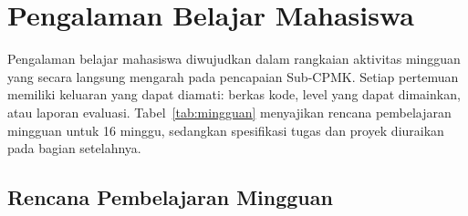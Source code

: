 
\section{Pengalaman Belajar Mahasiswa}

Pengalaman belajar mahasiswa diwujudkan dalam rangkaian aktivitas mingguan yang
secara langsung mengarah pada pencapaian Sub-CPMK. Setiap pertemuan memiliki
keluaran yang dapat diamati: berkas kode, level yang dapat dimainkan, atau
laporan evaluasi. Tabel~\ref{tab:mingguan} menyajikan rencana pembelajaran
mingguan untuk 16 minggu, sedangkan spesifikasi tugas dan proyek diuraikan
pada bagian setelahnya.

\subsection{Rencana Pembelajaran Mingguan}

